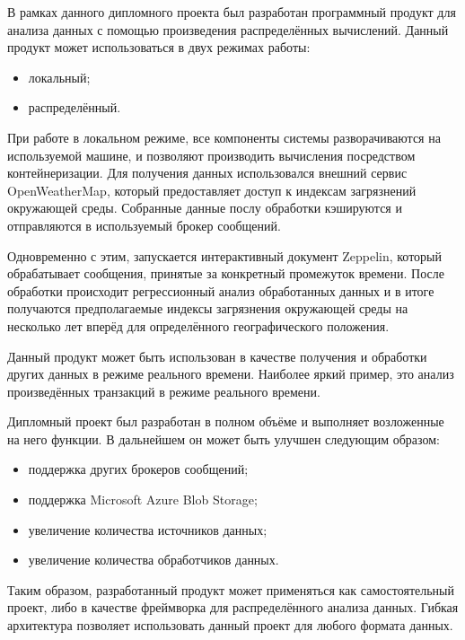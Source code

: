 \label{sec:outro}

В рамках данного дипломного проекта был разработан программный продукт для анализа данных с помощью произведения распределённых вычислений.
Данный продукт может использоваться в двух режимах работы:
\begin{itemize}
    \item локальный;
    \item распределённый.
\end{itemize}

При работе в локальном режиме, все компоненты системы разворачиваются на используемой машине, и позволяют производить вычисления посредством контейнеризации.
Для получения данных использовался внешний сервис OpenWeatherMap, который предоставляет доступ к индексам загрязнений окружающей среды.
Собранные данные послу обработки кэшируются и отправляются в используемый брокер сообщений.

Одновременно с этим, запускается интерактивный документ Zeppelin, который обрабатывает сообщения, принятые за конкретный промежуток времени.
После обработки происходит регрессионный анализ обработанных данных и в итоге получаются предполагаемые индексы загрязнения окружающей среды на несколько лет вперёд для определённого географического положения.

Данный продукт может быть использован в качестве получения и обработки других данных в режиме реального времени.
Наиболее яркий пример, это анализ произведённых транзакций в режиме реального времени.

Дипломный проект был разработан в полном объёме и выполняет возложенные на него функции.
В дальнейшем он может быть улучшен следующим образом:
\begin{itemize}
    \item поддержка других брокеров сообщений;
    \item поддержка Microsoft Azure Blob Storage;
    \item увеличение количества источников данных;
    \item увеличение количества обработчиков данных.
\end{itemize}

Таким образом, разработанный продукт может применяться как самостоятельный проект, либо в качестве фреймворка для распределённого анализа данных.
Гибкая архитектура позволяет использовать данный проект для любого формата данных.

